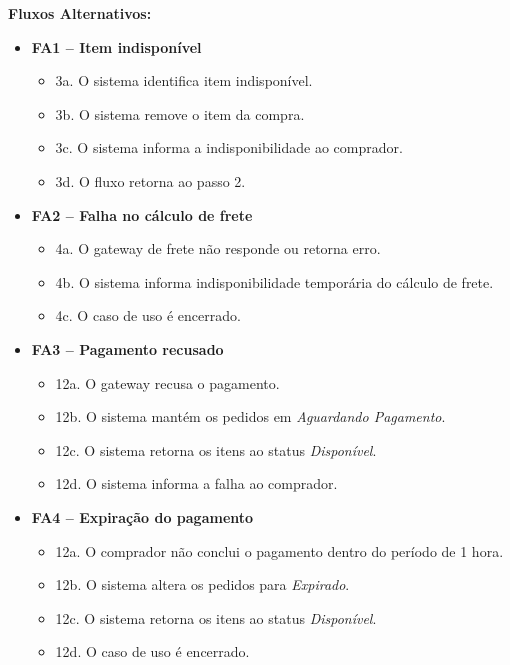 \documentclass[
	article,			%
	11pt,				%
	oneside,			%
	a4paper,			%
	english,			%
	brazil,				%
	sumario=tradicional
	]{abntex2}
\begin{document}
\vspace{0.5em}
\noindent\textbf{Fluxos Alternativos:}
\begin{itemize}[leftmargin=*]
    \item \textbf{FA1 – Item indisponível}
    \begin{itemize}[label={}, leftmargin=0.5cm]
        \item 3a. O sistema identifica item indisponível.
        \item 3b. O sistema remove o item da compra.
        \item 3c. O sistema informa a indisponibilidade ao comprador.
        \item 3d. O fluxo retorna ao passo 2.
    \end{itemize}
    
    \item \textbf{FA2 – Falha no cálculo de frete}
    \begin{itemize}[label={}, leftmargin=0.5cm]
        \item 4a. O gateway de frete não responde ou retorna erro.
        \item 4b. O sistema informa indisponibilidade temporária do cálculo de frete.
        \item 4c. O caso de uso é encerrado.
    \end{itemize}

    \item \textbf{FA3 – Pagamento recusado}
    \begin{itemize}[label={}, leftmargin=0.5cm]
        \item 12a. O gateway recusa o pagamento.
        \item 12b. O sistema mantém os pedidos em \textit{Aguardando Pagamento}.
        \item 12c. O sistema retorna os itens ao status \textit{Disponível}.
        \item 12d. O sistema informa a falha ao comprador.
    \end{itemize}

    \item \textbf{FA4 – Expiração do pagamento}
    \begin{itemize}[label={}, leftmargin=0.5cm]
        \item 12a. O comprador não conclui o pagamento dentro do período de 1 hora.
        \item 12b. O sistema altera os pedidos para \textit{Expirado}.
        \item 12c. O sistema retorna os itens ao status \textit{Disponível}.
        \item 12d. O caso de uso é encerrado.
    \end{itemize}
\end{itemize}
\end{document}
